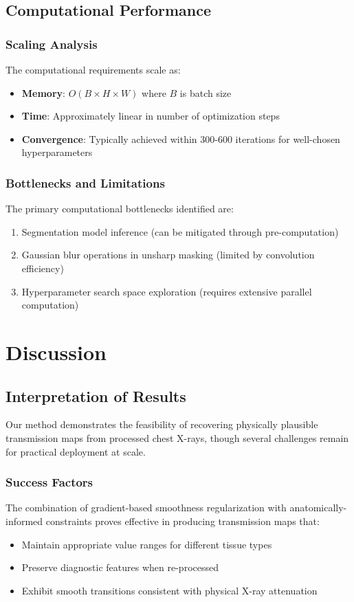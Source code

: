 \documentclass[nomenclature, english, bibtex]{kththesis}
\numberwithin{listing}{chapter}
\begin{document}
\section{Computational Performance}
\subsection{Scaling Analysis}
The computational requirements scale as:
\begin{itemize}
    \item \textbf{Memory}: $O(B \times H \times W)$ where $B$ is batch size
    \item \textbf{Time}: Approximately linear in number of optimization steps
    \item \textbf{Convergence}: Typically achieved within 300-600 iterations for well-chosen hyperparameters
\end{itemize}

\subsection{Bottlenecks and Limitations}
The primary computational bottlenecks identified are:
\begin{enumerate}
    \item Segmentation model inference (can be mitigated through pre-computation)
    \item Gaussian blur operations in unsharp masking (limited by convolution efficiency)
    \item Hyperparameter search space exploration (requires extensive parallel computation)
\end{enumerate}

\cleardoublepage
\chapter{Discussion}
\label{ch:discussion}

\section{Interpretation of Results}
Our method demonstrates the feasibility of recovering physically plausible transmission maps from processed chest X-rays, though several challenges remain for practical deployment at scale.

\subsection{Success Factors}
The combination of gradient-based smoothness regularization with anatomically-informed constraints proves effective in producing transmission maps that:
\begin{itemize}
    \item Maintain appropriate value ranges for different tissue types
    \item Preserve diagnostic features when re-processed
    \item Exhibit smooth transitions consistent with physical X-ray attenuation
\end{itemize}
\end{document}
